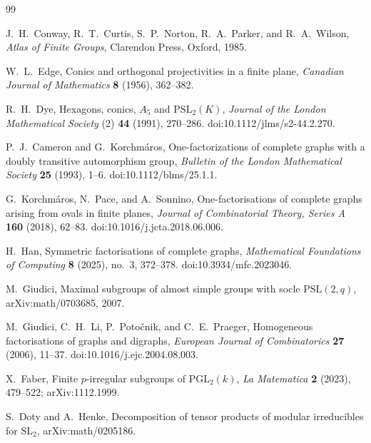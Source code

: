 \documentclass[11pt]{article}
\theoremstyle{definition}
\theoremstyle{remark}
\begin{document}
\begin{thebibliography}{99}

J.~H.~Conway, R.~T.~Curtis, S.~P.~Norton, R.~A.~Parker, and
R.~A.~Wilson,
\newblock \emph{Atlas of Finite Groups},
\newblock Clarendon Press, Oxford, 1985.

W.~L.~Edge,
\newblock Conics and orthogonal projectivities in a finite plane,
\newblock \emph{Canadian Journal of Mathematics} \textbf{8} (1956),
362--382.

R.~H.~Dye,
\newblock Hexagons, conics, $A_5$ and $\mathrm{PSL}_2(K)$,
\newblock \emph{Journal of the London Mathematical Society} (2)
\textbf{44} (1991), 270--286.
\newblock doi:10.1112/jlms/s2-44.2.270.

P.~J.~Cameron and G.~Korchm\'aros,
\newblock One-factorizations of complete graphs with a doubly transitive
automorphism group,
\newblock \emph{Bulletin of the London Mathematical Society} \textbf{25}
(1993), 1--6.
\newblock doi:10.1112/blms/25.1.1.

G.~Korchm\'aros, N.~Pace, and A.~Sonnino,
\newblock One-factorisations of complete graphs arising from ovals in finite
planes,
\newblock \emph{Journal of Combinatorial Theory, Series A} \textbf{160}
(2018), 62--83.
\newblock doi:10.1016/j.jcta.2018.06.006.

H.~Han,
\newblock Symmetric factorisations of complete graphs,
\newblock \emph{Mathematical Foundations of Computing} \textbf{8}
(2025), no.~3, 372--378.
\newblock doi:10.3934/mfc.2023046.

M.~Giudici,
\newblock Maximal subgroups of almost simple groups with socle
$\mathrm{PSL}(2,q)$,
\newblock arXiv:math/0703685, 2007.

M.~Giudici, C.~H.~Li, P.~Poto\v{c}nik, and C.~E.~Praeger,
\newblock Homogeneous factorisations of graphs and digraphs,
\newblock \emph{European Journal of Combinatorics} \textbf{27} (2006),
11--37.
\newblock doi:10.1016/j.ejc.2004.08.003.

X.~Faber,
\newblock Finite \(p\)-irregular subgroups of \(\mathrm{PGL}_2(k)\),
\newblock \emph{La Matematica} \textbf{2} (2023), 479--522;
arXiv:1112.1999.

S.~Doty and A.~Henke,
\newblock Decomposition of tensor products of modular irreducibles for
\(\mathrm{SL}_2\),
\newblock arXiv:math/0205186.


\end{thebibliography}
\end{document}
